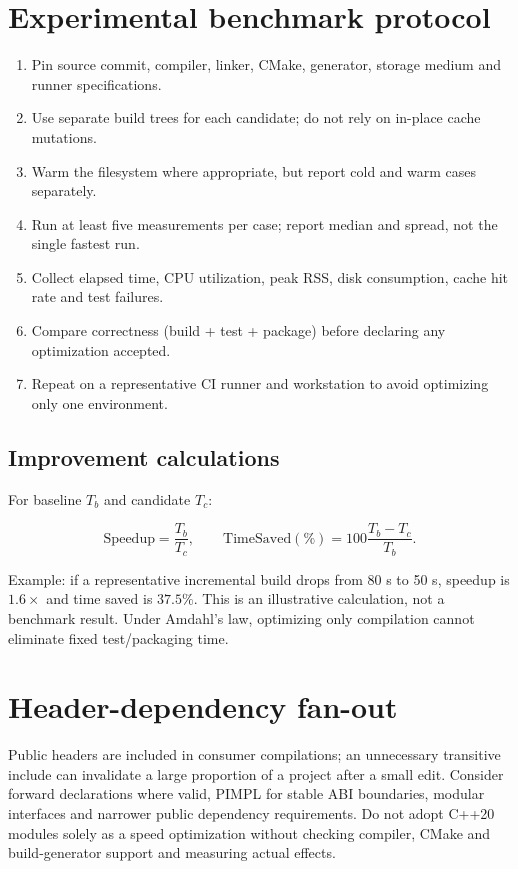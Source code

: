 \documentclass[11pt,letterpaper,oneside]{report}
\providecommand{\tightlist}{\setlength{\itemsep}{0pt}\setlength{\parskip}{0pt}}
\begin{document}
\chapter{Experimental benchmark
protocol}\label{experimental-benchmark-protocol}

\begin{enumerate}
\def\labelenumi{\arabic{enumi}.}
\tightlist
\item
  Pin source commit, compiler, linker, CMake, generator, storage medium
  and runner specifications.
\item
  Use separate build trees for each candidate; do not rely on in-place
  cache mutations.
\item
  Warm the filesystem where appropriate, but report cold and warm cases
  separately.
\item
  Run at least five measurements per case; report median and spread, not
  the single fastest run.
\item
  Collect elapsed time, CPU utilization, peak RSS, disk consumption,
  cache hit rate and test failures.
\item
  Compare correctness (build + test + package) before declaring any
  optimization accepted.
\item
  Repeat on a representative CI runner and workstation to avoid
  optimizing only one environment.
\end{enumerate}

\section{Improvement calculations}\label{improvement-calculations}

For baseline \(T_b\) and candidate \(T_c\):

\[
\mathrm{Speedup}=\frac{T_b}{T_c},\qquad
\mathrm{TimeSaved}(\%)=100\frac{T_b-T_c}{T_b}.
\]

Example: if a representative incremental build drops from 80 s to 50 s,
speedup is \(1.6\times\) and time saved is \(37.5\%\). This is an
illustrative calculation, not a benchmark result. Under Amdahl's law,
optimizing only compilation cannot eliminate fixed test/packaging time.

\chapter{Header-dependency fan-out}\label{header-dependency-fan-out}

Public headers are included in consumer compilations; an unnecessary
transitive include can invalidate a large proportion of a project after
a small edit. Consider forward declarations where valid, PIMPL for
stable ABI boundaries, modular interfaces and narrower public dependency
requirements. Do not adopt C++20 modules solely as a speed optimization
without checking compiler, CMake and build-generator support and
measuring actual effects.
\end{document}
